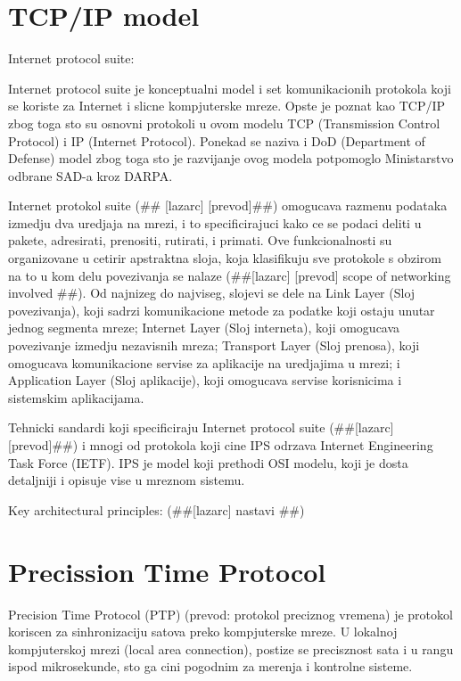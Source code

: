 \documentclass[a4paper,12pt, master]{etf}
\begin{document}
	\section{TCP/IP model}
	Internet protocol suite:

	Internet protocol suite je konceptualni model i set komunikacionih protokola koji se 
	koriste za Internet i slicne kompjuterske mreze. Opste je poznat kao TCP/IP zbog toga sto 
	su osnovni protokoli u ovom modelu TCP (Transmission Control Protocol) i IP (Internet 
	Protocol). Ponekad se naziva i DoD (Department of Defense) model zbog toga sto je 
	razvijanje ovog modela potpomoglo Ministarstvo odbrane SAD-a kroz DARPA.

	Internet protokol suite (\#\# [lazarc] [prevod]\#\#) omogucava razmenu podataka izmedju dva
	uredjaja na mrezi, i to specificirajuci kako ce se podaci deliti u pakete, adresirati,
	prenositi, rutirati, i primati. Ove funkcionalnosti su organizovane u cetirir apstraktna 
	sloja, koja klasifikuju sve protokole s obzirom na to u kom delu povezivanja se nalaze 
	(\#\#[lazarc] [prevod] scope of networking involved \#\#). Od najnizeg do najviseg, 
	slojevi se dele na Link	Layer (Sloj povezivanja), koji sadrzi komunikacione metode za 
	podatke koji ostaju unutar jednog segmenta mreze; Internet Layer (Sloj interneta), koji 
	omogucava povezivanje izmedju nezavisnih mreza; Transport Layer (Sloj prenosa), koji 
	omogucava komunikacione servise za aplikacije na uredjajima u mrezi; i Application Layer 
	(Sloj aplikacije), koji omogucava servise korisnicima i	sistemskim aplikacijama.

	Tehnicki sandardi koji specificiraju Internet protocol suite (\#\#[lazarc] [prevod]\#\#) i 
	mnogi od protokola koji cine IPS odrzava Internet Engineering Task Force (IETF). IPS je 
	model koji prethodi OSI modelu, koji je dosta detaljniji i opisuje vise u mreznom sistemu.

	Key architectural principles:
	(\#\#[lazarc] nastavi \#\#)

	\section{Precission Time Protocol}
	Precision Time Protocol (PTP) (prevod: protokol preciznog vremena) je protokol
	koriscen za sinhronizaciju satova preko kompjuterske mreze. U lokalnoj
	kompjuterskoj mrezi (local area connection), postize se precisznost sata i u rangu
	ispod mikrosekunde, sto ga cini pogodnim za merenja i kontrolne sisteme.
\end{document}
